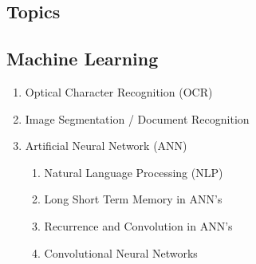 \documentclass[12pt]{article}
\begin{document}
\begin{appendix}
      \section{Topics}

      \subsection{Machine Learning}
      
      \begin{enumerate}
      \item Optical Character Recognition (OCR) \nocite{reul2019ocr4all} \nocite{sexton2005database}
      \item Image Segmentation / Document Recognition \nocite{lecun1998gradient} \nocite{suzuki2003infty}
      \item Artificial Neural Network (ANN) \nocite{cheng2017survey}
        \begin{enumerate}
        \item Natural Language Processing (NLP)
        \item Long Short Term Memory in ANN's
        \item Recurrence and Convolution in ANN's
        \item Convolutional Neural Networks
        \end{enumerate}
      \end{enumerate}

\end{appendix}

\printbibliography{}
\end{document}
